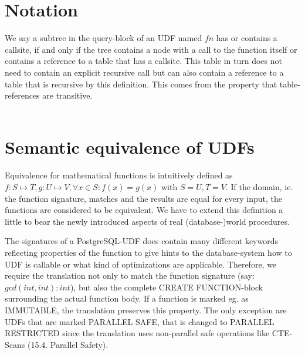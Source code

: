 

\section{Notation}
We say a subtree in the query-block of an UDF named $fn$ has or contains a callsite, if and only if the tree contains a node with a call to the function itself or contains a reference to a table that has a callsite. This table in turn does not need to contain an explicit recursive call but can also contain a reference to a table that is recursive by this definition. This comes from the property that table-references are transitive.
\\\\
\section{Semantic equivalence of UDFs}
Equivalence for mathematical functions is intuitively defined as $f: S \mapsto T, g: U \mapsto V, \forall x \in S: f(x) = g(x)$ with $S = U, T = V$. If the domain, ie. the function signature, matches and the results are equal for every input, the functions are considered to be equivalent. We have to extend this definition a little to bear the newly introduced aspects of real (database-)world procedures.

The signatures of a PostgreSQL-UDF does contain many different keywords reflecting properties of the function to give hints to the database-system how to UDF is callable or what kind of optimizations are applicable. Therefore, we require the translation not only to match the function signature (say: $gcd(int, int) : int$), but also the complete CREATE FUNCTION-block surrounding the actual function body. If a function is marked eg. as IMMUTABLE, the translation preserves this property. The only exception are UDFs that are marked PARALLEL SAFE, that is changed to PARALLEL RESTRICTED since the translation uses non-parallel safe operations like CTE-Scans (15.4. Parallel Safety).

